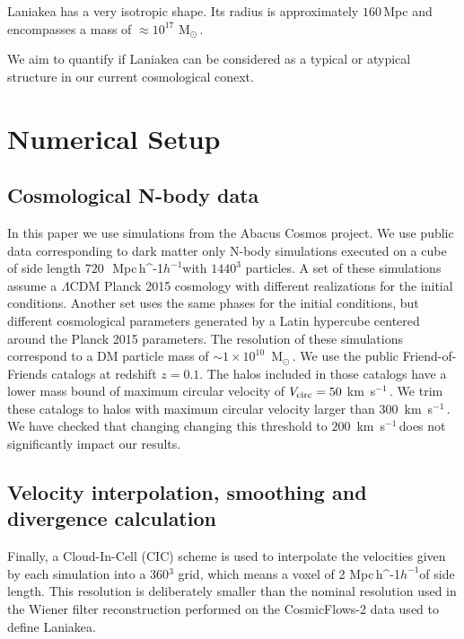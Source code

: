 \documentclass[usenatbib]{mnras}
\newcommand{\Msun}{\,{\rm M}$_{\odot}$\,}
\newcommand{\Mpch}{\,{\rm Mpc}\,\ifmmode h^{-1}\else $h^{-1}$\fi}
\newcommand{\kms}{\,{\rm km}\ s$^{-1}$\,}
\begin{document}
Laniakea has a very isotropic shape. 
Its radius is approximately $160$\,Mpc and encompasses a mass of
$\approx 10^{17}$\,\Msun.

We aim to quantify if Laniakea can be considered as a typical or atypical 
structure in our current cosmological conext.



\section{Numerical Setup}
\label{sec:numerical_setup}
\subsection{Cosmological N-body data}


In this paper we use simulations from the Abacus Cosmos project.
We use public data corresponding to dark matter only N-body simulations executed on a cube of side length $720$\ \Mpch with $1440^3$ particles. 
A set of these simulations assume a $\Lambda$CDM Planck 2015 cosmology with different realizations for the initial conditions.
Another set uses the same phases for the initial conditions, but different cosmological parameters generated by a Latin hypercube centered around the Planck 2015 parameters. 
The resolution of these simulations correspond to a DM particle mass
of $\sim 1 \times 10^{10}$ \Msun.
We use the public Friend-of-Friends catalogs at redshift $z=0.1$.
The halos included in those catalogs have a lower mass bound of 
maximum circular velocity of $V_{\rm circ}=50$\,\kms.
We trim these catalogs to halos with maximum circular velocity larger than $300$ \kms.
We have checked that changing changing this threshold to $200$ \kms does not
significantly impact our results.



\subsection{Velocity interpolation, smoothing and divergence calculation}  
Finally, a Cloud-In-Cell (CIC) scheme is used to interpolate the velocities given by each simulation into a 360$^3$ grid, which means a voxel of 2\,\Mpch of side length. This resolution is deliberately smaller than the nominal resolution
used in the Wiener filter reconstruction performed on the
CosmicFlows-2 data used to define Laniakea.
\end{document}
